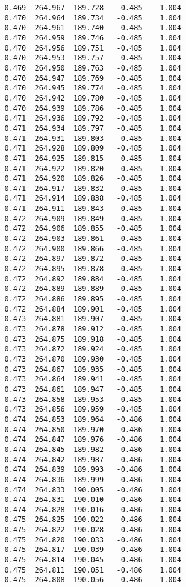 \begin{verbatim}
   0.469  264.967  189.728   -0.485    1.004
   0.470  264.964  189.734   -0.485    1.004
   0.470  264.961  189.740   -0.485    1.004
   0.470  264.959  189.746   -0.485    1.004
   0.470  264.956  189.751   -0.485    1.004
   0.470  264.953  189.757   -0.485    1.004
   0.470  264.950  189.763   -0.485    1.004
   0.470  264.947  189.769   -0.485    1.004
   0.470  264.945  189.774   -0.485    1.004
   0.470  264.942  189.780   -0.485    1.004
   0.470  264.939  189.786   -0.485    1.004
   0.471  264.936  189.792   -0.485    1.004
   0.471  264.934  189.797   -0.485    1.004
   0.471  264.931  189.803   -0.485    1.004
   0.471  264.928  189.809   -0.485    1.004
   0.471  264.925  189.815   -0.485    1.004
   0.471  264.922  189.820   -0.485    1.004
   0.471  264.920  189.826   -0.485    1.004
   0.471  264.917  189.832   -0.485    1.004
   0.471  264.914  189.838   -0.485    1.004
   0.471  264.911  189.843   -0.485    1.004
   0.472  264.909  189.849   -0.485    1.004
   0.472  264.906  189.855   -0.485    1.004
   0.472  264.903  189.861   -0.485    1.004
   0.472  264.900  189.866   -0.485    1.004
   0.472  264.897  189.872   -0.485    1.004
   0.472  264.895  189.878   -0.485    1.004
   0.472  264.892  189.884   -0.485    1.004
   0.472  264.889  189.889   -0.485    1.004
   0.472  264.886  189.895   -0.485    1.004
   0.472  264.884  189.901   -0.485    1.004
   0.473  264.881  189.907   -0.485    1.004
   0.473  264.878  189.912   -0.485    1.004
   0.473  264.875  189.918   -0.485    1.004
   0.473  264.872  189.924   -0.485    1.004
   0.473  264.870  189.930   -0.485    1.004
   0.473  264.867  189.935   -0.485    1.004
   0.473  264.864  189.941   -0.485    1.004
   0.473  264.861  189.947   -0.485    1.004
   0.473  264.858  189.953   -0.485    1.004
   0.473  264.856  189.959   -0.485    1.004
   0.474  264.853  189.964   -0.486    1.004
   0.474  264.850  189.970   -0.486    1.004
   0.474  264.847  189.976   -0.486    1.004
   0.474  264.845  189.982   -0.486    1.004
   0.474  264.842  189.987   -0.486    1.004
   0.474  264.839  189.993   -0.486    1.004
   0.474  264.836  189.999   -0.486    1.004
   0.474  264.833  190.005   -0.486    1.004
   0.474  264.831  190.010   -0.486    1.004
   0.474  264.828  190.016   -0.486    1.004
   0.475  264.825  190.022   -0.486    1.004
   0.475  264.822  190.028   -0.486    1.004
   0.475  264.820  190.033   -0.486    1.004
   0.475  264.817  190.039   -0.486    1.004
   0.475  264.814  190.045   -0.486    1.004
   0.475  264.811  190.051   -0.486    1.004
   0.475  264.808  190.056   -0.486    1.004

\end{verbatim}
